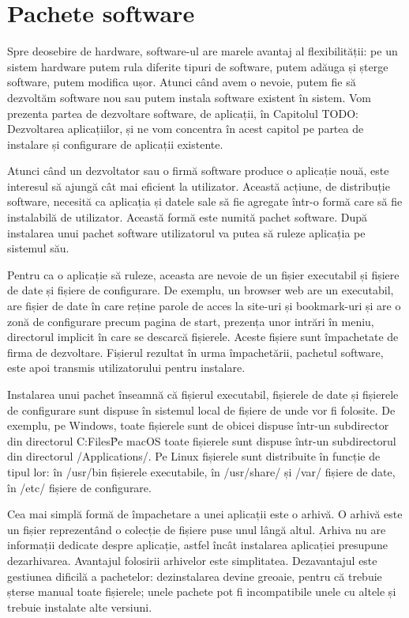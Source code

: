 \chapter{Pachete software}
\label{chapter:package}

Spre deosebire de hardware, software-ul are marele avantaj al flexibilității: pe un sistem hardware putem rula diferite tipuri de software, putem adăuga și șterge software, putem modifica ușor. Atunci când avem o nevoie, putem fie să dezvoltăm software nou sau putem instala software existent în sistem. Vom prezenta partea de dezvoltare software, de aplicații, în Capitolul TODO: Dezvoltarea aplicațiilor, și ne vom concentra în acest capitol pe partea de instalare și configurare de aplicații existente.

Atunci când un dezvoltator sau o firmă software produce o aplicație nouă, este interesul să ajungă cât mai eficient la utilizator. Această acțiune, de distribuție software, necesită ca aplicația și datele sale să fie agregate într-o formă care să fie instalabilă de utilizator. Această formă este numită pachet software. După instalarea unui pachet software utilizatorul va putea să ruleze aplicația pe sistemul său.

Pentru ca o aplicație să ruleze, aceasta are nevoie de un fișier executabil și fișiere de date și fișiere de configurare. De exemplu, un browser web are un executabil, are fișier de date în care reține parole de acces la site-uri și bookmark-uri și are o zonă de configurare precum pagina de start, prezența unor intrări în meniu, directorul implicit în care se descarcă fișierele. Aceste fișiere sunt împachetate de firma de dezvoltare. Fișierul rezultat în urma împachetării, pachetul software, este apoi transmis utilizatorului pentru instalare. 

Instalarea unui pachet înseamnă că fișierul executabil, fișierele de date și fișierele de configurare sunt dispuse în sistemul local de fișiere de unde vor fi folosite. De exemplu, pe Windows, toate fișierele sunt de obicei dispuse într-un subdirector din directorul C:\Program Files\. Pe macOS toate fișierele sunt dispuse într-un subdirectorul din directorul /Applications/. Pe Linux fișierele sunt distribuite în funcție de tipul lor: în /usr/bin fișierele executabile, în /usr/share/ și /var/ fișiere de date, în /etc/ fișiere de configurare.

Cea mai simplă formă de împachetare a unei aplicații este o arhivă. O arhivă este un fișier reprezentând o colecție de fișiere puse unul lângă altul. Arhiva nu are informații dedicate despre aplicație, astfel încât instalarea aplicației presupune dezarhivarea. Avantajul folosirii arhivelor este simplitatea. Dezavantajul este gestiunea dificilă a pachetelor: dezinstalarea devine greoaie, pentru că trebuie șterse manual toate fișierele; unele pachete pot fi incompatibile unele cu altele și trebuie instalate alte versiuni.

